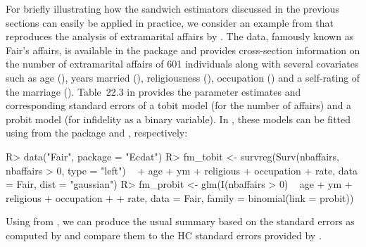 \documentclass{Z}
\begin{document}
For briefly illustrating how the sandwich estimators discussed in the
previous sections can easily be applied in practice, we consider an
example from \citet[Section~22.3.6]{hac:Greene:2003} that reproduces
the analysis of extramarital affairs by \citet{hac:Fair:1978}. The data,
famously known as Fair's affairs, is available in the  package
\citep{hac:Croissant:2005} and provides cross-section information on the number
of extramarital affairs of 601 individuals along with several covariates such
as age (), years married (), religiousness (),
occupation () and a self-rating of the marriage ().
Table~22.3 in \cite{hac:Greene:2003} provides the parameter estimates and corresponding
standard errors of a tobit model (for the number of affairs) and a probit model
(for infidelity as a binary variable). In , these models can be
fitted using  from the  package \citep{hac:Thernau+Lumley:2006}
and , respectively:

\begin{Schunk}
\begin{Sinput}
R> data("Fair", package = "Ecdat")
R> fm_tobit <- survreg(Surv(nbaffairs, nbaffairs > 0, type = "left") ~ 
+     age + ym + religious + occupation + rate, data = Fair, dist = "gaussian")
R> fm_probit <- glm(I(nbaffairs > 0) ~ age + ym + religious + occupation + 
+     rate, data = Fair, family = binomial(link = probit))
\end{Sinput}
\end{Schunk}

Using  from  \citep{hac:Zeileis+Hothorn:2002},
we can produce the usual summary based on the standard errors as computed by
 \citep[which reproduces the results in][]{hac:Greene:2003}
and compare them to the HC standard errors provided by .
\end{document}
